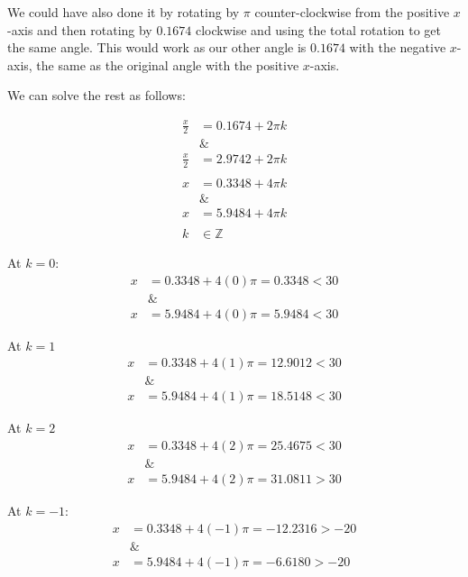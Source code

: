 \documentclass[12pt]{article}
\theoremstyle{definition}
\begin{document}
We could have also done it by rotating by $\pi$ counter-clockwise from the positive $x$-axis and then rotating by $0.1674$ clockwise and using the total rotation to get the same angle.
This would work as our other angle is $0.1674$ with the negative $x$-axis, the same as the original angle with the positive $x$-axis.

We can solve the rest as follows:

\begin{align}
    \frac{x}{2} & = 0.1674 + 2\pi k \\
                & \&                \\
    \frac{x}{2} & = 2.9742 + 2\pi k \\
    \nonumber                       \\
    x           & = 0.3348 + 4\pi k \\
                & \&                \\
    x           & = 5.9484 + 4\pi k \\
    \nonumber                       \\
    k           & \in \mathbb{Z}
\end{align}

At $k=0$:
\begin{align}
    x & = 0.3348 + 4(0)\pi = 0.3348 < 30 \\
      & \&                               \\
    x & = 5.9484 + 4(0)\pi = 5.9484 < 30
\end{align}

At $k=1$
\begin{align}
    x & = 0.3348 + 4(1)\pi = 12.9012 < 30 \\
      & \&                                \\
    x & = 5.9484 + 4(1)\pi = 18.5148 < 30
\end{align}

At $k=2$
\begin{align}
    x & = 0.3348 + 4(2)\pi = 25.4675 < 30 \\
      & \&                                \\
    x & = 5.9484 + 4(2)\pi = 31.0811 > 30
\end{align}

At $k=-1$:
\begin{align}
    x & = 0.3348 + 4(-1)\pi = -12.2316 > -20 \\
      & \&                                   \\
    x & = 5.9484 + 4(-1)\pi = -6.6180 > -20
\end{align}
\end{document}
